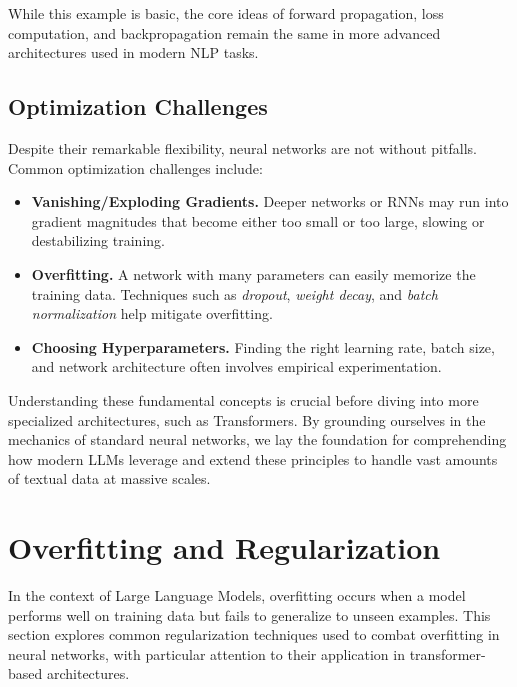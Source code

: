\noindent
While this example is basic, the core ideas of forward propagation, loss computation, and backpropagation remain the same in more advanced architectures used in modern NLP tasks.

\subsection{Optimization Challenges}
\noindent
Despite their remarkable flexibility, neural networks are not without pitfalls. Common optimization challenges include:
\begin{itemize}
    \item \textbf{Vanishing/Exploding Gradients.} Deeper networks or RNNs may run into gradient magnitudes that become either too small or too large, slowing or destabilizing training.
    \item \textbf{Overfitting.} A network with many parameters can easily memorize the training data. Techniques such as \emph{dropout}, \emph{weight decay}, and \emph{batch normalization} help mitigate overfitting.
    \item \textbf{Choosing Hyperparameters.} Finding the right learning rate, batch size, and network architecture often involves empirical experimentation.
\end{itemize}

\noindent
Understanding these fundamental concepts is crucial before diving into more specialized architectures, such as Transformers. By grounding ourselves in the mechanics of standard neural networks, we lay the foundation for comprehending how modern LLMs leverage and extend these principles to handle vast amounts of textual data at massive scales.

\section{Overfitting and Regularization}
\label{sec:overfitting_regularization}

\noindent
In the context of Large Language Models, overfitting occurs when a model performs well on training data but fails to generalize to unseen examples. This section explores common regularization techniques used to combat overfitting in neural networks, with particular attention to their application in transformer-based architectures.

